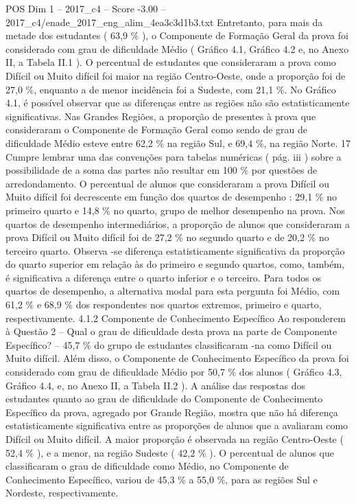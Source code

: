 \begin{textsample}{POS Dim 1 – 2017\_c4 – Score -3.00 – 2017\_c4/enade\_2017\_eng\_alim\_4ea3c3d1b3.txt}
Entretanto, para mais da metade dos estudantes ( 63,9 \% ), o Componente de Formação Geral da prova foi considerado com grau de dificuldade Médio ( Gráfico 4.1, Gráfico 4.2 e, no Anexo II, a Tabela II.1 ).
O percentual de estudantes que consideraram a prova como Difícil ou Muito difícil foi maior na região Centro-Oeste, onde a proporção foi de 27,0 \%, enquanto a de menor incidência foi a Sudeste, com 21,1 \%.
No Gráfico 4.1, é possível observar que as diferenças entre as regiões não são estatisticamente significativas.
Nas Grandes Regiões, a proporção de presentes à prova que consideraram o Componente de Formação Geral como sendo de grau de dificuldade Médio esteve entre 62,2 \% na região Sul, e 69,4 \%, na região Norte. 17 Cumpre lembrar uma das convenções para tabelas numéricas ( pág. iii ) sobre a possibilidade de a soma das partes não resultar em 100 \% por questões de arredondamento.
O percentual de alunos que consideraram a prova Difícil ou Muito difícil foi decrescente em função dos quartos de desempenho : 29,1 \% no primeiro quarto e 14,8 \% no quarto, grupo de melhor desempenho na prova.
Nos quartos de desempenho intermediários, a proporção de alunos que consideraram a prova Difícil ou Muito difícil foi de 27,2 \% no segundo quarto e de 20,2 \% no terceiro quarto.
Observa -se diferença estatisticamente significativa da proporção do quarto superior em relação às do primeiro e segundo quartos, como, também, é significativa a diferença entre o quarto inferior e o terceiro.
Para todos os quartos de desempenho, a alternativa modal para esta pergunta foi Médio, com 61,2 \% e 68,9 \% dos respondentes nos quartos extremos, primeiro e quarto, respectivamente. 4.1.2 Componente de Conhecimento Específico Ao responderem à Questão 2 – Qual o grau de dificuldade desta prova na parte de Componente Específico? – 45,7 \% do grupo de estudantes classificaram -na como Difícil ou Muito difícil.
Além disso, o Componente de Conhecimento Específico da prova foi considerado com grau de dificuldade Médio por 50,7 \% dos alunos ( Gráfico 4.3, Gráfico 4.4, e, no Anexo II, a Tabela II.2 ).
A análise das respostas dos estudantes quanto ao grau de dificuldade do Componente de Conhecimento Específico da prova, agregado por Grande Região, mostra que não há diferença estatisticamente significativa entre as proporções de alunos que a avaliaram como Difícil ou Muito difícil.
A maior proporção é observada na região Centro-Oeste ( 52,4 \% ), e a menor, na região Sudeste ( 42,2 \% ).
O percentual de alunos que classificaram o grau de dificuldade como Médio, no Componente de Conhecimento Específico, variou de 45,3 \% a 55,0 \%, para as regiões Sul e Nordeste, respectivamente.

\end{textsample}
